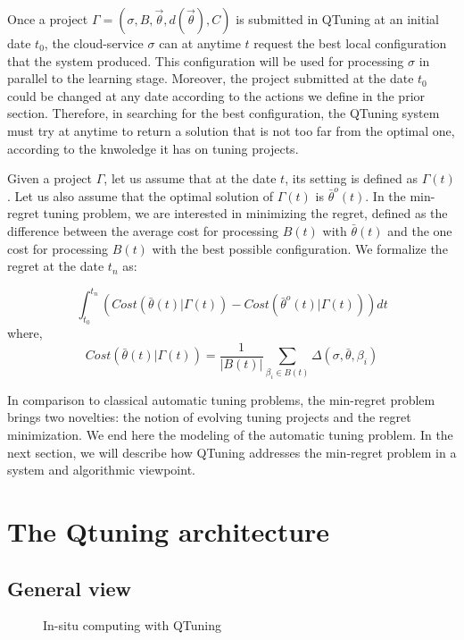 \documentclass[10pt, conference, compsocconf]{IEEEtran}
\begin{document}
Once a project $ \Gamma = (\sigma, B, \vec{\theta}, d(\vec{\theta}), C)$ is submitted in QTuning at an initial
date $t_0$, the cloud-service $\sigma$ can at anytime $t$ request the best local configuration that the
system produced. This configuration will be used for processing $\sigma$ in parallel to the  learning stage.
Moreover, the project submitted at the date $t_0$ could be changed at any date according to the actions we define
in the prior section. Therefore, in searching for the best configuration, the QTuning system must try at anytime
to return a solution that is not too far from the optimal one, according to the knwoledge it has on tuning projects.

Given a project $\Gamma$, let us assume that at the date $t$, its setting is defined as $\Gamma(t)$.
Let us also assume that the optimal solution of $\Gamma(t)$ is $\bar{\theta}^o(t)$.
In the min-regret tuning problem, we are interested in minimizing the regret, defined as the
difference between the average cost for processing $B(t)$ with $\bar{\theta}(t)$ and the one cost for
processing $B(t)$ with the best possible configuration. We formalize the regret at the date $t_n$ as:

\[
\int_{t_0}^{t_n} \left( Cost(\bar{\theta}(t)| \Gamma(t)) - Cost(\bar{\theta}^o(t) | \Gamma(t)) \right) dt
\]
where,
\[
Cost(\bar{\theta}(t) | \Gamma(t)) = \frac{1}{|B(t)|}\sum_{\beta_i \in B(t)} \Delta(\sigma, \bar{\theta}, \beta_i)
\]


In comparison to classical automatic tuning problems, the min-regret problem brings two novelties:
the notion of evolving tuning projects and the regret minimization.
We end here the modeling of the automatic tuning problem. In the next section, we will describe how
QTuning addresses the min-regret problem in a system and algorithmic viewpoint.

\section{The Qtuning architecture} \label{Architecture}

\subsection{General view}

	\begin{figure}[hbtp]
	\begin{center}
	
	\caption{In-situ computing with QTuning}
	\label{fig:QTuning}
	\end{center}
	\end{figure}
\end{document}
